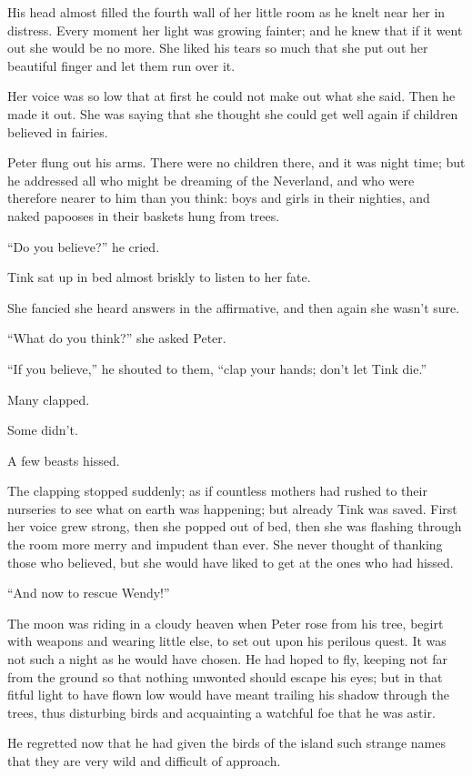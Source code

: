 His head almost filled the fourth wall of her little room as he knelt
near her in distress. Every moment her light was growing fainter; and
he knew that if it went out she would be no more. She liked his tears
so much that she put out her beautiful finger and let them run over it.

Her voice was so low that at first he could not make out what she said.
Then he made it out. She was saying that she thought she could get well
again if children believed in fairies.

Peter flung out his arms. There were no children there, and it was
night time; but he addressed all who might be dreaming of the
Neverland, and who were therefore nearer to him than you think: boys
and girls in their nighties, and naked papooses in their baskets hung
from trees.

``Do you believe?'' he cried.

Tink sat up in bed almost briskly to listen to her fate.

She fancied she heard answers in the affirmative, and then again she
wasn't sure.

``What do you think?'' she asked Peter.

``If you believe,'' he shouted to them, ``clap your hands; don't let Tink
die.''

Many clapped.

Some didn't.

A few beasts hissed.

The clapping stopped suddenly; as if countless mothers had rushed to
their nurseries to see what on earth was happening; but already Tink
was saved. First her voice grew strong, then she popped out of bed,
then she was flashing through the room more merry and impudent than
ever. She never thought of thanking those who believed, but she would
have liked to get at the ones who had hissed.

``And now to rescue Wendy!''

The moon was riding in a cloudy heaven when Peter rose from his tree,
begirt with weapons and wearing little else, to set out upon his
perilous quest. It was not such a night as he would have chosen. He had
hoped to fly, keeping not far from the ground so that nothing unwonted
should escape his eyes; but in that fitful light to have flown low
would have meant trailing his shadow through the trees, thus disturbing
birds and acquainting a watchful foe that he was astir.

He regretted now that he had given the birds of the island such strange
names that they are very wild and difficult of approach.

